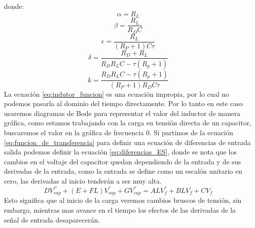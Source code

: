 \documentclass[journal]{IEEEtran}
\begin{document}
  donde:
  \[\alpha=R_{L}\]
  \[\beta=\frac{R_L}{R_DC}\]
  \[\epsilon=\frac{R_L}{(R_P+1)C\tau}\]
  \[\delta=\frac{R_D+R_L}{R_DR_LC-\tau (R_p+1)}\]
  \[k=\frac{R_DR_LC-\tau (R_p+1)}{(R_P+1)R_DC\tau}\]
  La ecuación \ref{eq:indutor_funcion} es una ecuación impropia,  por lo cual no podemos pasarla al dominio del tiempo directamente. Por lo tanto en este caso usaremos diagramas de Bode para representar el valor del inductor de manera gráfica, como estamos trabajando con la carga en tensión directa de un capacitor, buscaremos el valor en la gráfica de frecuencia 0.
  Si partimos de la ecuación \ref{eq:funcion_de_transferencia} para definir una ecuación de diferencias de entrada salida podemos definir la ecuación \ref{eq:diferencias_ES}, donde se nota que los cambios en el voltaje del capacitor quedan dependiendo de la entrada y de sus derivadas de la entrada, como la entrada se define como un escalón unitario en cero, las derivadas al inicio tenderán a ser muy alta.
  \begin{equation}
  \label{eq:diferencias_ES}
 DV_{cap}^{'''}+(E+FL)V_{cap}^{''}+GV_{cap}^{''}=ALV_{f}^{''}+BLV_{f}^{'}+CV_f
  \end{equation}
  Esto significa que al inicio de la carga veremos cambios bruscos de tensión, sin embargo, mientras mas avance en el tiempo los efectos de las derivadas de la señal de entrada desaparecerán.
\end{document}

